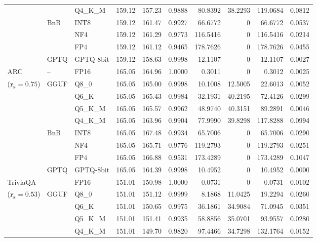 \begin{longtable}{ll l rrrrrrr}
 &  & Q4\_K\_M & 159.12 & 157.23 & 0.9888 & 80.8392 & 38.2293 & 119.0684 & 0.0812 \\
 & BnB & INT8 & 159.12 & 161.47 & 0.9927 & 66.6772 & \cellcolor{cyan!12} $0$ & 66.6772 & 0.0537 \\
 &  & NF4 & 159.12 & 161.29 & 0.9773 & 116.5416 & \cellcolor{cyan!12} $0$ & 116.5416 & 0.0214 \\
 &  & FP4 & 159.12 & 161.12 & \cellcolor{red!18} 0.9465 & \cellcolor{red!18} 178.7626 & \cellcolor{cyan!12} $0$ & \cellcolor{red!18} 178.7626 & \cellcolor{red!18} 0.0455 \\
 & GPTQ & GPTQ-8bit & 159.12 & 158.63 & 0.9998 & 12.1107 & \cellcolor{cyan!12} $0$ & 12.1107 & 0.0027 \\
\midrule
ARC & -- & FP16 & 165.05 & 164.96 & 1.0000 & 0.3011 & \cellcolor{cyan!12} $0$ & 0.3012 & 0.0025 \\
{\small ($\mathbf{r_s{=}0.75}$)} & GGUF & Q8\_0 & 165.05 & 165.00 & 0.9998 & 10.1008 & 12.5005 & 22.6013 & 0.0052 \\
 &  & Q6\_K & 165.05 & 165.43 & 0.9984 & 32.1931 & 40.2195 & 72.4126 & 0.0299 \\
 &  & Q5\_K\_M & 165.05 & 165.57 & 0.9962 & 48.9740 & 40.3151 & 89.2891 & 0.0046 \\
 &  & Q4\_K\_M & 165.05 & 163.96 & 0.9904 & 77.9990 & 39.8298 & 117.8288 & 0.0994 \\
 & BnB & INT8 & 165.05 & 167.48 & 0.9934 & 65.7006 & \cellcolor{cyan!12} $0$ & 65.7006 & 0.0290 \\
 &  & NF4 & 165.05 & 165.71 & 0.9776 & 119.2793 & \cellcolor{cyan!12} $0$ & 119.2793 & 0.0251 \\
 &  & FP4 & 165.05 & 166.88 & 0.9531 & 173.4289 & \cellcolor{cyan!12} $0$ & 173.4289 & 0.1047 \\
 & GPTQ & GPTQ-8bit & 165.05 & 164.39 & 0.9998 & 10.4952 & \cellcolor{cyan!12} $0$ & 10.4952 & 0.0000 \\
\midrule
TriviaQA & -- & FP16 & 151.01 & 150.98 & 1.0000 & 0.0731 & \cellcolor{cyan!12} $0$ & 0.0731 & 0.0102 \\
{\small ($\mathbf{r_s{=}0.53}$)} & GGUF & Q8\_0 & 151.01 & 151.12 & 0.9999 & 8.1868 & 11.0425 & 19.2294 & 0.0260 \\
 &  & Q6\_K & 151.01 & 150.65 & 0.9975 & 36.1861 & 34.9084 & 71.0945 & 0.0351 \\
 &  & Q5\_K\_M & 151.01 & 151.41 & 0.9935 & 58.8856 & 35.0701 & 93.9557 & 0.0280 \\
 &  & Q4\_K\_M & 151.01 & 149.70 & 0.9820 & 97.4466 & 34.7298 & 132.1764 & 0.0152 \\

\end{longtable}
